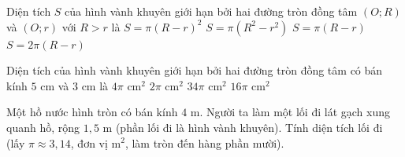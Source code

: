 

\begin{ex}%
	Diện tích $S$ của hình vành khuyên giới hạn bởi hai đường tròn đồng tâm $(O;R)$ và $(O;r)$ với $R>r$ là
	\choice
	{$S=\pi(R-r)^2$}
	{\True $S=\pi\left(R^2-r^2\right)$}
	{$S=\pi(R-r)$}
	{$S=2\pi(R-r)$}
\end{ex}

\begin{ex}%
	Diện tích của hình vành khuyên giới hạn bởi hai đường tròn đồng tâm có bán kính $5\text{ cm}$ và $3\text{ cm}$ là
	\choice
	{$4\pi\text{ cm}^2$}
	{$2\pi\text{ cm}^2$}
	{$34\pi\text{ cm}^2$}
	{\True $16\pi\text{ cm}^2$}
\end{ex}

\begin{bt}%
	Một hồ nước hình tròn có bán kính $4\text{ m}$. Người ta làm một lối đi lát gạch xung quanh hồ, rộng $1{,}5\text{ m}$ (phần lối đi là hình vành khuyên). Tính diện tích lối đi (lấy $\pi\approx 3{,}14$, đơn vị m$^2$, làm tròn đến hàng phần mười).
\end{bt}

